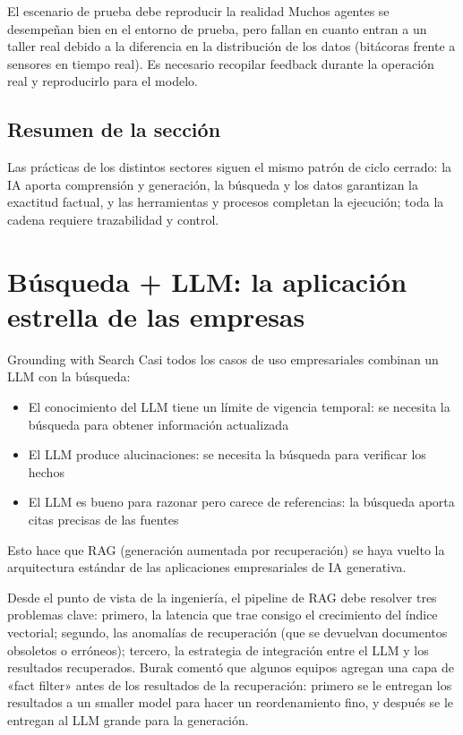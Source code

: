 \documentclass[a4paper]{article}
\begin{document}
\begin{warningbox}{El escenario de prueba debe reproducir la realidad}
Muchos agentes se desempeñan bien en el entorno de prueba, pero fallan en cuanto entran a un taller real debido a la diferencia en la distribución de los datos (bitácoras frente a sensores en tiempo real). Es necesario recopilar feedback durante la operación real y reproducirlo para el modelo.
\end{warningbox}

\subsection{Resumen de la sección}

Las prácticas de los distintos sectores siguen el mismo patrón de ciclo cerrado: la IA aporta comprensión y generación, la búsqueda y los datos garantizan la exactitud factual, y las herramientas y procesos completan la ejecución; toda la cadena requiere trazabilidad y control.

\section{Búsqueda + LLM: la aplicación estrella de las empresas}

\begin{importantbox}{Grounding with Search}
Casi todos los casos de uso empresariales combinan un LLM con la búsqueda:
\begin{itemize}
    \item El conocimiento del LLM tiene un límite de vigencia temporal: se necesita la búsqueda para obtener información actualizada
    \item El LLM produce alucinaciones: se necesita la búsqueda para verificar los hechos
    \item El LLM es bueno para razonar pero carece de referencias: la búsqueda aporta citas precisas de las fuentes
\end{itemize}
Esto hace que RAG (generación aumentada por recuperación) se haya vuelto la arquitectura estándar de las aplicaciones empresariales de IA generativa.
\end{importantbox}

Desde el punto de vista de la ingeniería, el pipeline de RAG debe resolver tres problemas clave: primero, la latencia que trae consigo el crecimiento del índice vectorial; segundo, las anomalías de recuperación (que se devuelvan documentos obsoletos o erróneos); tercero, la estrategia de integración entre el LLM y los resultados recuperados. Burak comentó que algunos equipos agregan una capa de «fact filter» antes de los resultados de la recuperación: primero se le entregan los resultados a un smaller model para hacer un reordenamiento fino, y después se le entregan al LLM grande para la generación.
\end{document}
